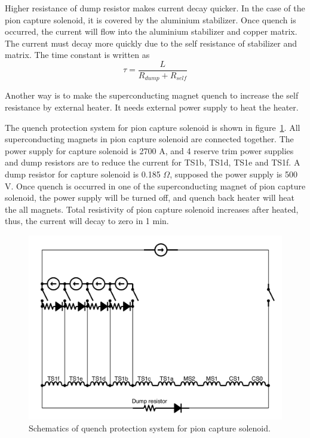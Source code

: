 Higher resistance of dump resistor makes current decay quicker.
In the case of the pion capture solenoid, it is covered by the aluminium stabilizer.
Once quench is occurred, the current will flow into the aluminium stabilizer and copper matrix.
The current must decay more quickly due to the self resistance of stabilizer and matrix.
The time constant is written as
\begin{equation}
 \tau = \frac{L}{R_{dump} + R_{self}}
\end{equation}

Another way is to make the superconducting magnet quench to increase the self resistance by external heater.
It needs external power supply to heat the heater.

The quench protection system for pion capture solenoid is shown in figure~\ref{capture}.
All superconducting magnets in pion capture solenoid are connected together.
The power supply for capture solenoid is 2700 A, and 4 reserve trim power supplies and dump resistors are to reduce the current for TS1b, TS1d, TS1e and TS1f.
A dump resistor for capture solenoid is 0.185 $\Omega$, supposed the power supply is 500 V.
Once quench is occurred in one of the superconducting magnet of pion capture solenoid, the power supply will be turned off, and quench back heater will heat the all magnets.
Total resistivity of pion capture solenoid increases after heated, thus, the current will decay to zero in 1 min.
\begin{figure}[H]
 \centering
 \includegraphics[scale=0.38]{chapter2/fig/capture.pdf}
 \caption{Schematics of quench protection system for pion capture solenoid.}
 \label{capture}
\end{figure}

